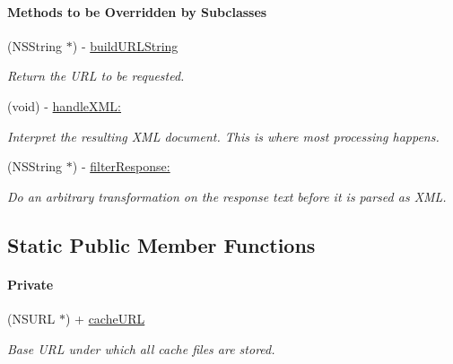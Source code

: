 \begin{Indent}\paragraph*{Methods to be Overridden by Subclasses}
\begin{DoxyCompactItemize}
\item 
(NSString $\ast$) -\/ \hyperlink{interface_p_c_soap_fetcher_aeee2fb86d6545b680ba1640b06f90666}{buildURLString}
\begin{DoxyCompactList}\small\item\em Return the URL to be requested. \end{DoxyCompactList}\item 
\hypertarget{interface_p_c_soap_fetcher_a7a77dc500460d5cfd72d7c00a2341edb}{
(void) -\/ \hyperlink{interface_p_c_soap_fetcher_a7a77dc500460d5cfd72d7c00a2341edb}{handleXML:}}
\label{interface_p_c_soap_fetcher_a7a77dc500460d5cfd72d7c00a2341edb}

\begin{DoxyCompactList}\small\item\em Interpret the resulting XML document. This is where most processing happens. \end{DoxyCompactList}\item 
(NSString $\ast$) -\/ \hyperlink{interface_p_c_soap_fetcher_a0a361f130f7e6ea4d69fbadd29b67314}{filterResponse:}
\begin{DoxyCompactList}\small\item\em Do an arbitrary transformation on the response text before it is parsed as XML. \end{DoxyCompactList}\end{DoxyCompactItemize}
\end{Indent}
\subsection*{Static Public Member Functions}
\begin{Indent}\paragraph*{Private}
\begin{DoxyCompactItemize}
\item 
\hypertarget{interface_p_c_soap_fetcher_aa83fb0bd22fb51a8a3b5762a0abec8fc}{
(NSURL $\ast$) + \hyperlink{interface_p_c_soap_fetcher_aa83fb0bd22fb51a8a3b5762a0abec8fc}{cacheURL}}
\label{interface_p_c_soap_fetcher_aa83fb0bd22fb51a8a3b5762a0abec8fc}

\begin{DoxyCompactList}\small\item\em Base URL under which all cache files are stored. \end{DoxyCompactList}\end{DoxyCompactItemize}
\end{Indent}
